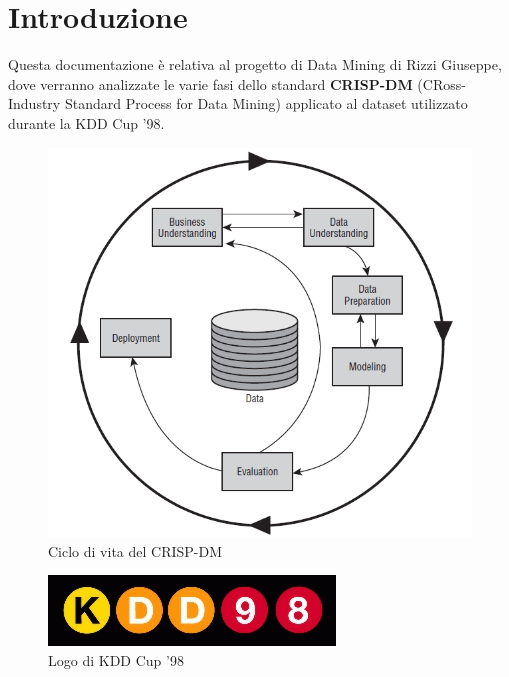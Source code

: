 \chapter{Introduzione}
Questa documentazione è relativa al progetto di Data Mining di Rizzi Giuseppe, dove verranno analizzate le varie fasi dello standard \textbf{CRISP-DM} (CRoss-Industry Standard Process for Data Mining) applicato al dataset utilizzato durante la KDD Cup '98.

\bigskip

\begin{figure}[h!]
	\centering
    \includegraphics[width=.5\linewidth]{./images/crispdm}
    \caption{Ciclo di vita del CRISP-DM}	
\end{figure}

\bigskip

\begin{figure}[h!]
	\centering
    \includegraphics{./images/kdd98}
    \caption{Logo di KDD Cup '98}
\end{figure}